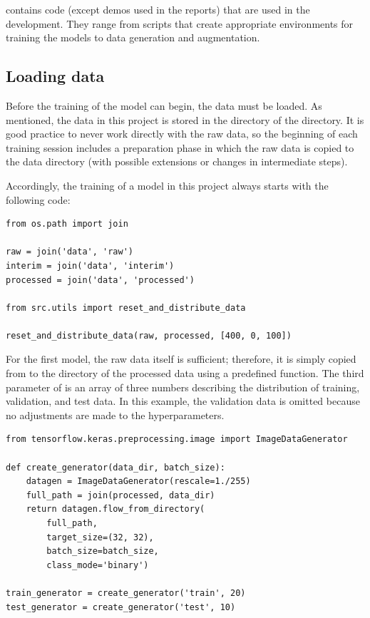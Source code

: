  contains code (except demos used in the reports) that are used in the development. They range from scripts that create appropriate environments for training the models to data generation and augmentation.

\subsection{Loading data}

Before the training of the model can begin, the data must be loaded.
As mentioned, the data in this project is stored in the  directory of the  directory.
It is good practice to never work directly with the raw data, so the beginning of each training session includes a preparation phase in which the raw data is copied to the  data directory (with possible extensions or changes in intermediate steps).

Accordingly, the training of a model in this project always starts with the following code:

\begin{lstlisting}
from os.path import join

raw = join('data', 'raw')
interim = join('data', 'interim')
processed = join('data', 'processed')
    
from src.utils import reset_and_distribute_data
    
reset_and_distribute_data(raw, processed, [400, 0, 100])
\end{lstlisting}

For the first model, the raw data itself is sufficient; therefore, it is simply copied from  to the directory of the processed data using a predefined function.
The third parameter of  is an array of three numbers describing the distribution of training, validation, and test data.
In this example, the validation data is omitted because no adjustments are made to the hyperparameters.

\begin{lstlisting}
from tensorflow.keras.preprocessing.image import ImageDataGenerator

def create_generator(data_dir, batch_size):
    datagen = ImageDataGenerator(rescale=1./255)
    full_path = join(processed, data_dir)
    return datagen.flow_from_directory(
        full_path,
        target_size=(32, 32),
        batch_size=batch_size,
        class_mode='binary')

train_generator = create_generator('train', 20)
test_generator = create_generator('test', 10)
\end{lstlisting}

